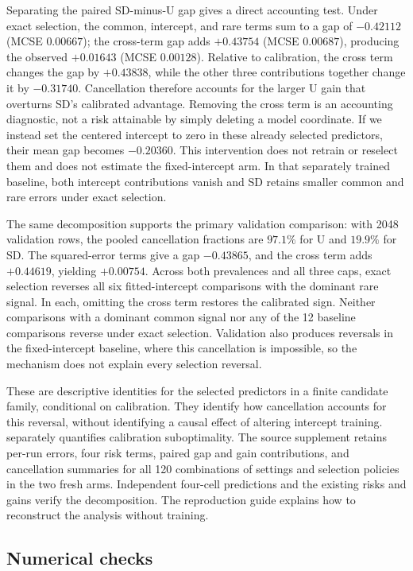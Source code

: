\documentclass{alt2027}
\begin{document}
Separating the paired SD-minus-U gap gives a direct accounting test. Under exact
selection, the common, intercept, and rare terms sum to a gap of $-0.42112$
(MCSE $0.00667$); the cross-term gap adds $+0.43754$ (MCSE $0.00687$), producing
the observed $+0.01643$ (MCSE $0.00128$). Relative to calibration, the cross
term changes the gap by $+0.43838$, while the other three contributions together
change it by $-0.31740$. Cancellation therefore accounts for the larger U gain
that overturns SD's calibrated advantage. Removing the cross term is an
accounting diagnostic, not a risk attainable by simply deleting a model
coordinate. If we instead set the centered intercept to zero in these already
selected predictors, their mean gap becomes $-0.20360$. This intervention does
not retrain or reselect them and does not estimate the fixed-intercept arm. In
that separately trained baseline, both intercept contributions vanish and SD
retains smaller common and rare errors under exact selection.

The same decomposition supports the primary validation comparison: with 2048
validation rows, the pooled cancellation fractions are $97.1\%$ for U and
$19.9\%$ for SD\@. The squared-error terms give a gap $-0.43865$, and the cross
term adds $+0.44619$, yielding $+0.00754$. Across both prevalences and all three
caps, exact selection reverses all six fitted-intercept comparisons with the
dominant rare signal. In each, omitting the cross term restores the calibrated
sign. Neither comparisons with a dominant common signal nor any of the 12
baseline comparisons reverse under exact selection. Validation also produces
reversals in the fixed-intercept baseline, where this cancellation is
impossible, so the mechanism does not explain every selection reversal.

These are descriptive identities for the selected predictors in a finite
candidate family, conditional on calibration. They identify how cancellation
accounts for this reversal, without identifying a causal effect of altering
intercept training.  separately quantifies
calibration suboptimality. The source supplement retains per-run errors, four
risk terms, paired gap and gain contributions, and cancellation summaries for
all 120 combinations of settings and selection policies in the two fresh arms.
Independent four-cell predictions and the existing risks and gains verify the
decomposition. The reproduction guide explains how to reconstruct the analysis
without training.

\subsection{Numerical checks}
\end{document}
